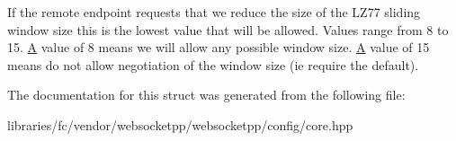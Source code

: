If the remote endpoint requests that we reduce the size of the L\+Z77 sliding window size this is the lowest value that will be allowed. Values range from 8 to 15. \mbox{\hyperlink{struct_a}{A}} value of 8 means we will allow any possible window size. \mbox{\hyperlink{struct_a}{A}} value of 15 means do not allow negotiation of the window size (ie require the default). 

The documentation for this struct was generated from the following file\+:\begin{DoxyCompactItemize}
\item 
libraries/fc/vendor/websocketpp/websocketpp/config/core.\+hpp\end{DoxyCompactItemize}
